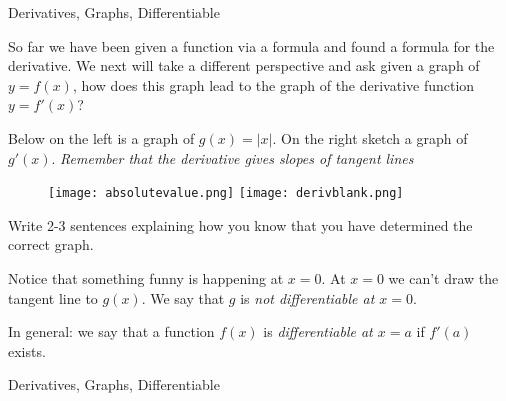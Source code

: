 
\begin{tagblock}{Derivatives, Graphs, Differentiable}
\begin{question}
	


So far we have been given a function via a formula and found a formula for the derivative.  We next will take a different perspective and ask  given a graph of $y=f(x)$, how does this graph lead to the graph of the derivative function $y=f'(x)$? 

\bigskip

Below on the left is a graph of $g(x) = |x|$.  On the right sketch a graph of $g'(x)$. \emph{Remember that the derivative gives slopes of tangent lines}  


\begin{figure}[h]
\centering
\texttt{[image: absolutevalue.png]} \hspace{.2in} \texttt{[image: derivblank.png]} \end{figure}

Write 2-3 sentences explaining how you know that you have determined the correct graph. 

\vspace{2in}
Notice that something funny is happening at $x=0$.  At $x=0$ we can't draw the tangent line to $g(x)$.  We say that $g$ is \emph{not differentiable at $x=0$}.

In general:  we say that a function $f(x)$ is \emph{differentiable at $x=a$} if $f'(a)$ exists.

	
\begin{tags}
	    Derivatives, Graphs, Differentiable
\end{tags}
	
\begin{diary}
\end{diary}
	
\begin{solution}
	   
\end{solution}
	
\end{question}

\end{tagblock}



